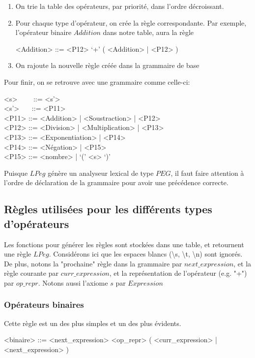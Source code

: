 \documentclass{article}
\begin{document}
\begin{enumerate}
	\item On trie la table des opérateurs, par priorité, dans l'ordre décroissant.
	\item Pour chaque type d'opérateur, on crée la règle correspondante. Par exemple, l'opérateur binaire $Addition$ dans notre table, aura la règle
	\begin{grammar}
		<Addition> ::= <P12> `+' ( <Addition> | <P12> )
	\end{grammar}
	\item On rajoute la nouvelle règle créée dans la grammaire de base
\end{enumerate}
Pour finir, on se retrouve avec une grammaire comme celle-ci:
\begin{grammar}
<s> \ \ \ \ ::= <s'>\\
<s'> \ \ \ ::= <P11>\\
<P11> ::= <Addition> | <Soustraction> | <P12>\\
<P12> ::= <Division> | <Multiplication> | <P13>\\
<P13> ::= <Exponentiation> | <P14>\\
<P14> ::= <Négation> | <P15>\\
<P15> ::= <nombre> | `(' <s> `)'
\end{grammar}
Puisque $LPeg$ génère un analyseur lexical de type $PEG$, il faut faire attention à l'ordre de déclaration de la grammaire pour avoir une précédence correcte.

\subsection{Règles utilisées pour les différents types d'opérateurs}
Les fonctions pour générer les règles sont stockées dans une table, et retournent une règle $LPeg$. Considérons ici que les espaces blancs (\textbackslash s, \textbackslash t, \textbackslash n) sont ignorés. De plus, notons la "prochaine" règle dans la grammaire par $next\_expression$, et la règle courante par $curr\_expression$, et la représentation de l'opérateur (e.g. "+") par $op\_repr$. Notons aussi l'axiome $s$ par $Expression$
\subsubsection{Opérateurs binaires}
Cette règle est un des plus simples et un des plus évidents.
\begin{grammar}
	<binaire> ::= <next\_expression> <op\_repr> ( <curr\_expression> | <next\_expression> )
\end{grammar}
\end{document}
